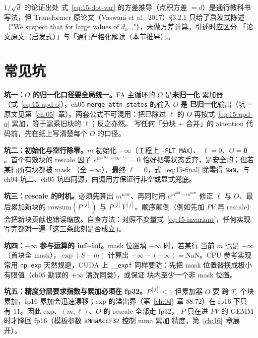 \begin{kaogu}[F3/F5 考据]{$1/\sqrt{d}$ 的论证出处}
  式~\ref{eq:15-dot-var} 的方差推导（点积方差 $= d$）是通行教科书写法，但
  Transformer 原论文（Vaswani et al., 2017）\S 3.2.1 只给了启发式陈述
  （"We suspect that for large values of $d_k$..."），未做方差计算。引述时应区分
  「论文原文（启发式）」与「通行严格化解读（本节推导）」。
\end{kaogu}

\section{常见坑}

\textbf{坑一：$O$ 的归一化口径要全局统一。}\allowbreak{}FA 主循环的 $O$ 是\textbf{未归一化}
累加器（式~\ref{eq:15-upd-o}），ch05 \texttt{merge\_\allowbreak{}attn\_\allowbreak{}states} 的输入 $O$ 是
\textbf{已归一化}输出（坑一原文见第~\ref{ch:05}~章）。两套公式不可混用：把已除过
$\ell$ 的 $O$ 再按式~\ref{eq:15-upd-o} 累加，等于漏乘旧块的 $\ell$；反之亦然。
写任何「分块 + 合并」的 attention 代码前，先在纸上写清楚每个 $O$ 的口径。

\textbf{坑二：初始化与空行除零。}$m$ 初始化 $-\infty$（工程上 \texttt{-FLT\_MAX}）、
$\ell = 0$、$O = \mathbf{0}$。首个有效块的 rescale 因子
$e^{m^{(0)} - m^{(1)}} = 0$ 恰好把零状态丢弃，是安全的；但若某行所有块都被 mask
（全 $-\infty$），最终 $\ell = 0$，式~\ref{eq:15-final} 除零得 \texttt{NaN}，与
ch04 坑二、ch05 坑四同源，由调用方保证行非空或显式兜底。

\textbf{坑三：rescale 的时机。}必须\textbf{先}算出 $m^{\mathrm{new}}$、再同时用
$e^{m^{\mathrm{old}} - m^{\mathrm{new}}}$ 修正 $\ell$ 与 $O$、最后累加新块的
$\mathrm{rowsum}(P^{[j]})$ 与 $P^{[j]}V^{[j]}$。顺序颠倒（例如先加 $PV$ 再 rescale）
会把新块贡献也错误缩放。自查方法：对照不变量式~\ref{eq:15-invariant}，任何实现
写完都对一遍「这三条此刻是否成立」。

\textbf{坑四：$-\infty$ 参与运算的 inf$-$inf。}\allowbreak{}mask 位置填 $-\infty$ 时，若某行
当前 $m$ 也是 $-\infty$（首块全 mask），$\exp(S - m)$ 计算出 $-\infty - (-\infty) =
\mathrm{NaN}$。CPU 参考实现常用 \texttt{np.exp} 天然规避，CUDA 上 \texttt{\_\_expf}
同样要防：先把 mask 位置替换成极小有限值（ch05 勘误的 $+\infty$ 清洗同类），或保证
块内至少一个非 mask 位置。

\textbf{坑五：精度分层要求指数与累加必须在 fp32。}$P^{[j]} \le 1$ 但累加器 $O$ 要
跨 $T_c$ 个块累加，fp16 累加会迅速漂移；exp 的溢出界（第~\ref{ch:04}~章
$88.72$）在 fp16 下只有 $11$。因此 exp、$(m, \ell)$、$O$ 的 rescale 全部走 fp32，
$P$ 只在进 $PV$ 的 GEMM 时才降回 fp16（模板参数 \texttt{kMmaAccF32} 控制 mma 累加
精度，第~\ref{ch:16}~章展开）。


